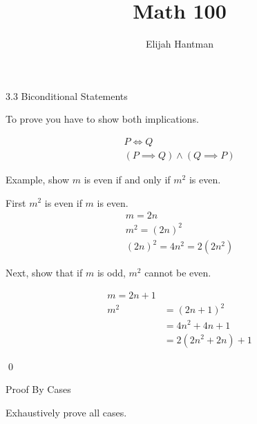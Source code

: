 \documentclass{report}
\title{\Huge{Math 100}}
\author{\huge{Elijah Hantman}}
\date{}
\begin{document}
\maketitle
\newpage

\begin{description}
    \item 3.3 Biconditional Statements

        To prove you have to show both implications.        

        \begin{mdframed}
            \begin{gather}
                P \iff Q\\
                (P \implies Q) \land (Q \implies P)
            \end{gather} 
        \end{mdframed}

        Example, show $m$ is even if and only if $m^2$ is even.
        \begin{mdframed}
            First $m^2$ is even if $m$ is even.
            \begin{gather}
                m = 2n\\ 
                m^2 = (2n)^2\\
                (2n)^2 = 4n^2 = 2 (2n^2)
            \end{gather}

            Next, show that if $m$ is odd, $m^2$ cannot be
            even.

            \begin{align}
                m = 2n + 1\\
                m^2 &= (2n + 1)^2\\
                    &= 4n^2 + 4n + 1\\
                    &= 2(2n^2 + 2n) + 1
            \end{align}

            \qed
        \end{mdframed}
    \item Proof By Cases

        Exhaustively prove all cases.

\end{description}
\end{document}
